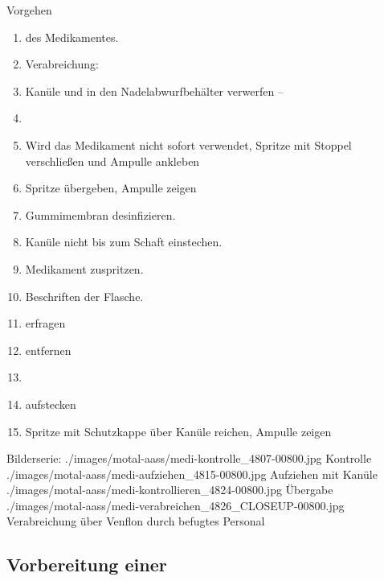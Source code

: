 \begin{ProcedureStepsWide}{Vorgehen}
\begin{enumerate}
  Beim Einführen der Kanüle in die Ampulle den
    Ampullenrand nicht berühren.
  \item {} des
  Medikamentes.
  \item Verabreichung:
    \item Kanüle  und in den
    Nadelabwurfbehälter verwerfen -- 
    \item {}
    \item Wird das Medikament nicht sofort verwendet, Spritze mit
    Stoppel verschließen und Ampulle ankleben
    \item Spritze übergeben, Ampulle zeigen
    \item Gummimembran desinfizieren.
    \item Kanüle nicht bis zum Schaft einstechen.
    \item Medikament zuspritzen.
    \item Beschriften der Flasche.
    \item {} erfragen
    \item {}  entfernen
    \item {}
    \item {} aufstecken
    \item Spritze mit Schutzkappe über Kanüle reichen, Ampulle zeigen
\end{enumerate}
\end{ProcedureStepsWide}


\begin{PictureSeriesWide}{}{Bilderserie:  }
{./images/motal-aass/medi-kontrolle_4807-00800.jpg}
{Kontrolle}
{./images/motal-aass/medi-aufziehen_4815-00800.jpg}
{Aufziehen mit Kanüle}
{./images/motal-aass/medi-kontrollieren_4824-00800.jpg}
{Übergabe}
{./images/motal-aass/medi-verabreichen_4826_CLOSEUP-00800.jpg}
{Verabreichung über Venflon durch befugtes Personal}
\end{PictureSeriesWide}



\subsection{Vorbereitung einer }
\label{topic:infusion}

